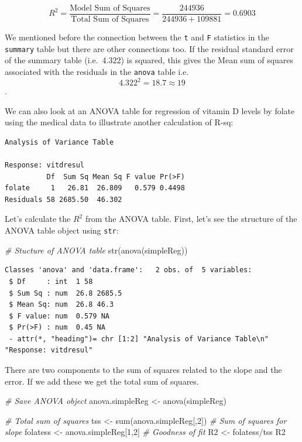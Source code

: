 \documentclass[
  oneside]{krantz}
\newenvironment{Shaded}{\begin{snugshade}}{\end{snugshade}}
\newcommand{\CommentTok}[1]{\textcolor[rgb]{0.56,0.35,0.01}{\textit{#1}}}
\newcommand{\DecValTok}[1]{\textcolor[rgb]{0.00,0.00,0.81}{#1}}
\newcommand{\FunctionTok}[1]{\textcolor[rgb]{0.00,0.00,0.00}{#1}}
\newcommand{\NormalTok}[1]{#1}
\newcommand{\OtherTok}[1]{\textcolor[rgb]{0.56,0.35,0.01}{#1}}
\newcommand{\SpecialCharTok}[1]{\textcolor[rgb]{0.00,0.00,0.00}{#1}}
\begin{document}
\[R^2 = \frac{\textrm{Model Sum of Squares}}{\textrm{Total Sum of Squares}} =\frac{244936}{244936+109881} = 0.6903\]

We mentioned before the connection between the \texttt{t} and \texttt{F} statistics in the \texttt{summary} table
but there are other connections too. If the residual standard error of the summary table (i.e.~\(4.322\)) is squared, this gives the Mean sum of squares associated with the residuals in the \texttt{anova} table i.e.\[ 4.322^2 = 18.7 \approx 19\].

We can also look at an ANOVA table for regression of vitamin D levels by folate using the medical data to illustrate another calculation of R-sq:

\begin{verbatim}
Analysis of Variance Table

Response: vitdresul
          Df  Sum Sq Mean Sq F value Pr(>F)
folate     1   26.81  26.809   0.579 0.4498
Residuals 58 2685.50  46.302               
\end{verbatim}

Let's calculate the \(R^2\) from the ANOVA table. First, let's see the structure of the ANOVA table object using \texttt{str}:

\begin{Shaded}
\begin{Highlighting}[]
\CommentTok{\# Stucture of ANOVA table}
\FunctionTok{str}\NormalTok{(}\FunctionTok{anova}\NormalTok{(simpleReg))}
\end{Highlighting}
\end{Shaded}

\begin{verbatim}
Classes 'anova' and 'data.frame':   2 obs. of  5 variables:
 $ Df     : int  1 58
 $ Sum Sq : num  26.8 2685.5
 $ Mean Sq: num  26.8 46.3
 $ F value: num  0.579 NA
 $ Pr(>F) : num  0.45 NA
 - attr(*, "heading")= chr [1:2] "Analysis of Variance Table\n" "Response: vitdresul"
\end{verbatim}

There are two components to the sum of squares related to the slope and the error. If we add these we get the total sum of squares.

\begin{Shaded}
\begin{Highlighting}[]
\CommentTok{\# Save ANOVA object}
\NormalTok{anova.simpleReg }\OtherTok{\textless{}{-}} \FunctionTok{anova}\NormalTok{(simpleReg)}

\CommentTok{\# Total sum of squares}
\NormalTok{tss }\OtherTok{\textless{}{-}} \FunctionTok{sum}\NormalTok{(anova.simpleReg[,}\DecValTok{2}\NormalTok{])}
\CommentTok{\# Sum of squares for slope}
\NormalTok{folatess }\OtherTok{\textless{}{-}}\NormalTok{ anova.simpleReg[}\DecValTok{1}\NormalTok{,}\DecValTok{2}\NormalTok{]}
\CommentTok{\# Goodness of fit}
\NormalTok{R2 }\OtherTok{\textless{}{-}}\NormalTok{ folatess}\SpecialCharTok{/}\NormalTok{tss}
\NormalTok{R2}
\end{Highlighting}
\end{Shaded}
\end{document}
